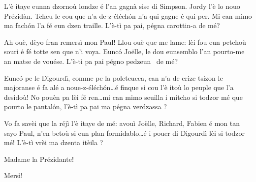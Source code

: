 \begin{drama}

\ridoiver


\Presidanspeaks {} L'è itaye eunna dzornoù londze é l'an gagnà sise di Simpson. Jordy l’è lo nouo Prézidàn. Tcheu le cou que n’a de-z-éléch\'on n’a qui gagne é qui per. Mi can mimo ma fach\'on l’a fé eun dzen traille. L'è-tì pa pai, pégna carottin-a \carota de mé?


\Presidanspeaks Ah ouè, dèyo fran remersì mon Paul! Llou ouè que me lame: lèi fou eun petchoù sourì é fé totte sen que n'i voya. Eunc\'o Jo\"{e}lle, le dou eunsemblo l'an pourto-me an matse de vouése. L’è-tì pa pai pégno pedzeun \pulcino\ de mé?


\Presidanspeaks Eunc\'o pe le Digourdì, comme pe la poleteucca, can n'a de crize tsizon le majoranse é fa alé a noue-z-éléch\'on\ldots é finque si cou l’è itoù lo peuple que l’a desidoù! No pouèn pa lèi fé ren\ldots mi can mimo seuilla i mitcho si todzor mé que pourto le pantal\'on, l'è-tì pa pai ma pégna verdzassa \scoiattolo ?


\Presidanspeaks Vo fa savèi que la réjì l’è itaye de mé: avouì Jo\"{e}lle, Richard, Fabien é  mon tan sayo Paul, 
n'en betoù si eun plan formidablo\ldots é i pouer di Digourdì lèi si todzor mé! L'è-tì vrèi ma dzenta itèila \stella ?


\Jordyspeaks Madame la Prézidante!

\Presidanspeaks {} Mersì!


\end{drama}
